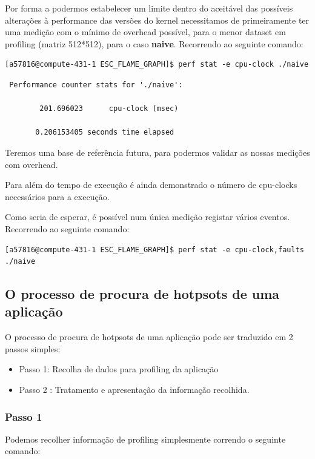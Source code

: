 \documentclass[conference,compsoc]{IEEEtran}
\begin{document}
\begin{itemize}
Por forma 	a podermos estabelecer um limite dentro do aceitável das possíveis alterações à performance das versões do kernel necessitamos de primeiramente ter uma medição com o mínimo de overhead possível, para o menor dataset em profiling (matriz 512*512), para o caso \textbf{naive}. Recorrendo ao seguinte comando:

 \begin{lstlisting}[style=command]
[a57816@compute-431-1 ESC_FLAME_GRAPH]$ perf stat -e cpu-clock ./naive
   \end{lstlisting}
\begin{lstlisting}
 Performance counter stats for './naive':

        201.696023      cpu-clock (msec)                                            

       0.206153405 seconds time elapsed
\end{lstlisting}
Teremos uma base de referência futura, para podermos validar as nossas medições com overhead.\par 
Para além do tempo de execução é ainda demonstrado o número de cpu-clocks necessários para a execução.\par  

Como seria de esperar, é possível num única medição registar vários eventos. Recorrendo ao seguinte comando:

 \begin{lstlisting}[style=command]
[a57816@compute-431-1 ESC_FLAME_GRAPH]$ perf stat -e cpu-clock,faults ./naive
   \end{lstlisting}

\subsection{O processo de procura de hotpsots de uma aplicação}       

O processo de procura de hotpsots de uma aplicação pode ser traduzido em 2 passos simples:
\begin{itemize}
\item Passo 1: Recolha de dados para profiling da aplicação
\item Passo 2 : Tratamento e apresentação da informação recolhida.
\end{itemize}
    
\subsubsection{Passo 1}
Podemos recolher informação de profiling simplesmente correndo o seguinte comando:
\label{passo1}


\end{itemize}
\end{document}
